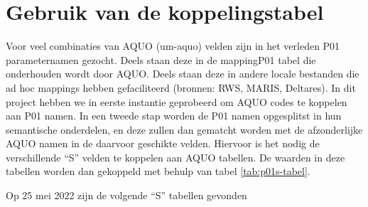 \documentclass[
]{book}
\begin{document}
\hypertarget{gebruik-van-de-koppelingstabel}{%
\section{Gebruik van de koppelingstabel}\label{gebruik-van-de-koppelingstabel}}

Voor veel combinaties van AQUO (um-aquo) velden zijn in het verleden P01 parameternamen gezocht. Deels staan deze in de mappingP01 tabel die onderhouden wordt door AQUO. Deels staan deze in andere locale bestanden die ad hoc mappings hebben gefaciliteerd (bronnen: RWS, MARIS, Deltares). In dit project hebben we in eerste instantie geprobeerd om AQUO codes te koppelen aan P01 namen. In een tweede stap worden de P01 namen opgesplitst in hun semantische onderdelen, en deze zullen dan gematcht worden met de afzonderlijke AQUO namen in de daarvoor geschikte velden. Hiervoor is het nodig de verschillende ``S'' velden te koppelen aan AQUO tabellen. De waarden in deze tabellen worden dan gekoppeld met behulp van tabel \ref{tab:p01s-tabel}.

Op 25 mei 2022 zijn de volgende ``S'' tabellen gevonden
\end{document}
